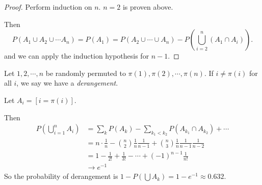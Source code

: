 \documentclass[a4paper]{article}
\begin{document}
\begin{proof}
  Perform induction on $n$. $n = 2$ is proven above.

  Then
  \[
    P(A_1\cup A_2\cup \cdots A_n) = P(A_1) = P(A_2\cup\cdots\cup A_n) - P\left(\bigcup_{i = 2}^n (A_1\cap A_i)\right).
  \]
  and we can apply the induction hypothesis for $n - 1$.
\end{proof}

\begin{eg}
  Let $1, 2, \cdots, n$ be randomly permuted to $\pi(1), \pi(2), \cdots, \pi(n)$. If 
  $i \not= \pi(i)$ for all $i$, we say we have a \emph{derangement}.

  Let $A_i = [i = \pi(i)]$.

  Then
  \begin{align*}
    P\left(\bigcup _{i = 1}^n A_i\right) &= \sum_{k} P(A_k) - \sum_{k_1 < k_2} P(A_{k_1} \cap A_{k_2}) + \cdots\\
    &= n\cdot \frac{1}{n} - \binom{n}{2}\frac{1}{n}\frac{1}{n - 1} + \binom{n}{3}\frac{1}{n}\frac{1}{n - 1}\frac{1}{n - 2}\\
    &= 1 - \frac{1}{2!} + \frac{1}{3!} - \cdots + (-1)^{n - 1}\frac{1}{n!}\\
    &\to e^{-1}
  \end{align*}
  So the probability of derangement is $1 - P(\bigcup A_k) = 1 - e^{-1}\approx 0.632$.
\end{eg}
\end{document}
